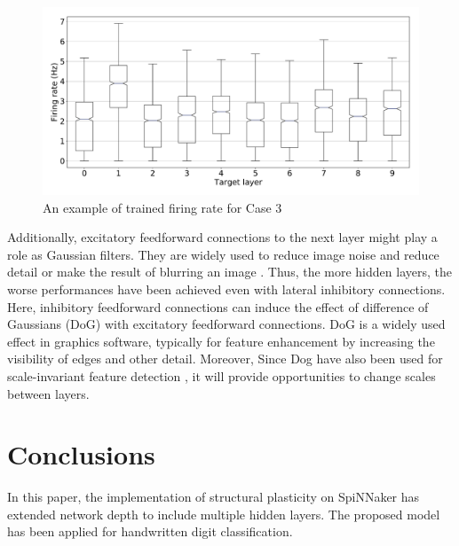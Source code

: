 \documentclass{article}
\begin{document}
\begin{figure}[tbh]
    \centering
    \includegraphics[width=0.80\linewidth, trim=0cm 0cm 0cm 0cm, clip=true]{mnist_training_firing_rate_boxplot_case_3_rate_pynn8}
    \caption{An example of trained firing rate for Case 3}
    \label{fig:fr_bp_c3}
\end{figure}

Additionally, excitatory feedforward connections to the next layer might play a role as Gaussian filters. They are widely used  to reduce image noise and reduce detail or make the result of blurring an image \cite{nixon2019feature}. Thus, the more hidden layers, the worse performances have been achieved even with lateral inhibitory connections.
Here, inhibitory feedforward connections can induce the effect of difference of Gaussians (DoG) with excitatory feedforward connections. DoG is a widely used effect in graphics software, typically for feature enhancement by increasing the visibility of edges and other detail. Moreover, Since Dog have also been used for scale-invariant feature detection \cite{lowe2004distinctive, bay2006surf}, it will provide opportunities to change scales between layers. 



\section{Conclusions}\label{sec:conclusions}

In this paper, the implementation of structural plasticity on SpiNNaker has extended network depth to include multiple hidden layers. 
The proposed model has been applied for handwritten digit classification. 
\end{document}
